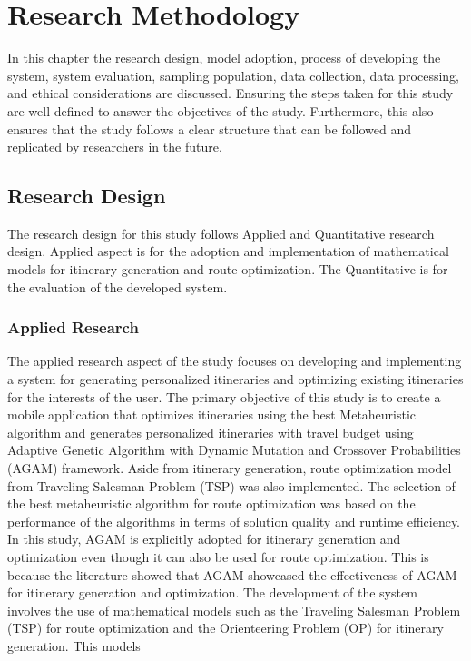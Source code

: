 \chapter{Research Methodology}
\thispagestyle{empty}

In this chapter the research design, model adoption, process of developing the system, system evaluation, sampling population, data collection, data processing, and ethical considerations are discussed. Ensuring the steps taken for this study are well-defined to answer the objectives of the study. Furthermore, this also ensures that the study follows a clear structure that can be followed and replicated by researchers in the future.

\section{Research Design}

The research design for this study follows Applied and Quantitative research design. Applied aspect is for the adoption and implementation of mathematical models for itinerary generation and route optimization. The Quantitative is for the evaluation of the developed system.

\subsection{Applied Research}
The applied research aspect of the study focuses on developing and implementing a system for generating personalized itineraries and optimizing existing itineraries for the interests of the user. The primary objective of this study is to create a mobile application that optimizes itineraries using the best Metaheuristic algorithm and generates personalized itineraries with travel budget using Adaptive Genetic Algorithm with Dynamic Mutation and Crossover Probabilities (AGAM) framework. Aside from itinerary generation, route optimization model from Traveling Salesman Problem (TSP) was also implemented. The selection of the best metaheuristic algorithm for route optimization was based on the performance of the algorithms in terms of solution quality and runtime efficiency. In this study, AGAM is explicitly adopted for itinerary generation and optimization even though it can also be used for route optimization. This is because the literature showed that AGAM showcased the effectiveness of AGAM for itinerary generation and optimization. The development of the system involves the use of mathematical models such as the Traveling Salesman Problem (TSP) for route optimization and the Orienteering Problem (OP) for itinerary generation. This models 

